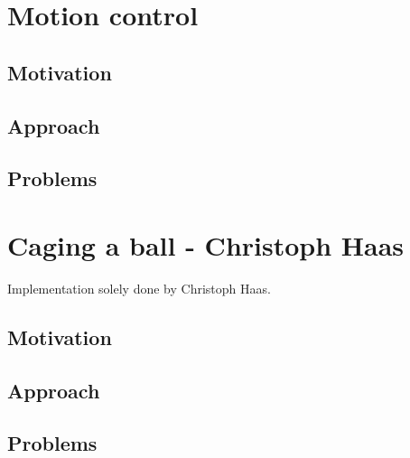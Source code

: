 \documentclass[703031]{iisreport}
\begin{document}
\section{Motion control}
\label{sec:motion}
\subsection{Motivation}

\subsection{Approach}

\subsection{Problems}


\section{Caging a ball - Christoph Haas}
\label{sec:caging}
Implementation solely done by Christoph Haas.

\subsection{Motivation}

\subsection{Approach}

\subsection{Problems}
\end{document}

